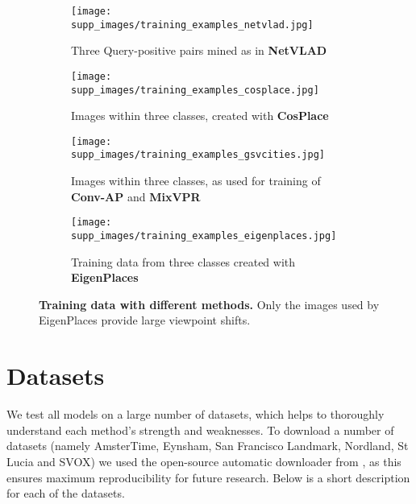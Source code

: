 \documentclass[10pt,twocolumn,letterpaper]{article}
\begin{document}
\begin{figure}
    \begin{center}
    \begin{subfigure}{\linewidth}
        \texttt{[image: supp\_images/training\_examples\_netvlad.jpg]}
        \caption{Three Query-positive pairs mined as in \textbf{NetVLAD}}
    \end{subfigure}
    \par\bigskip
    \begin{subfigure}{\linewidth}
        \texttt{[image: supp\_images/training\_examples\_cosplace.jpg]}
        \caption{Images within three classes, created with \textbf{CosPlace}}
    \end{subfigure}
    \par\bigskip
    \begin{subfigure}{\linewidth}
        \texttt{[image: supp\_images/training\_examples\_gsvcities.jpg]}
        \caption{Images within three classes, as used for training of \textbf{Conv-AP} and \textbf{MixVPR}}
    \end{subfigure}
    \par\bigskip
    \begin{subfigure}{\linewidth}
        \texttt{[image: supp\_images/training\_examples\_eigenplaces.jpg]}
        \caption{Training data from three classes created with \textbf{EigenPlaces}}
    \end{subfigure}
    \end{center}
    \caption{
    \textbf{Training data with different methods.} Only the images used by EigenPlaces provide large viewpoint shifts.
}
    \label{fig:supp_training_examples}
\end{figure}
 


\section{Datasets}
\label{sec:supp_datasets}

We test all models on a large number of datasets, which helps to thoroughly understand each method's strength and weaknesses.
To download a number of datasets (namely AmsterTime, Eynsham, San Francisco Landmark, Nordland, St Lucia and SVOX) we used the open-source automatic downloader from \cite{Berton_2022_benchmark}, as this ensures maximum reproducibility for future research.
Below is a short description for each of the datasets.
\end{document}
